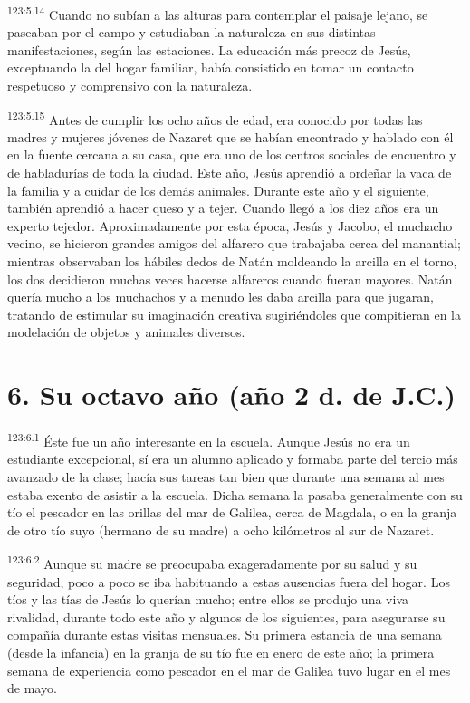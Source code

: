 \par 
\textsuperscript{123:5.14} Cuando no subían a las alturas para contemplar el paisaje lejano, se paseaban por el campo y estudiaban la naturaleza en sus distintas manifestaciones, según las estaciones. La educación más precoz de Jesús, exceptuando la del hogar familiar, había consistido en tomar un contacto respetuoso y comprensivo con la naturaleza.

\par 
\textsuperscript{123:5.15} Antes de cumplir los ocho años de edad, era conocido por todas las madres y mujeres jóvenes de Nazaret que se habían encontrado y hablado con él en la fuente cercana a su casa, que era uno de los centros sociales de encuentro y de habladurías de toda la ciudad. Este año, Jesús aprendió a ordeñar la vaca de la familia y a cuidar de los demás animales. Durante este año y el siguiente, también aprendió a hacer queso y a tejer. Cuando llegó a los diez años era un experto tejedor. Aproximadamente por esta época, Jesús y Jacobo, el muchacho vecino, se hicieron grandes amigos del alfarero que trabajaba cerca del manantial; mientras observaban los hábiles dedos de Natán moldeando la arcilla en el torno, los dos decidieron muchas veces hacerse alfareros cuando fueran mayores. Natán quería mucho a los muchachos y a menudo les daba arcilla para que jugaran, tratando de estimular su imaginación creativa sugiriéndoles que compitieran en la modelación de objetos y animales diversos.

\section*{6. Su octavo año (año 2 d. de J.C.)}
\par 
\textsuperscript{123:6.1} Éste fue un año interesante en la escuela. Aunque Jesús no era un estudiante excepcional, sí era un alumno aplicado y formaba parte del tercio más avanzado de la clase; hacía sus tareas tan bien que durante una semana al mes estaba exento de asistir a la escuela. Dicha semana la pasaba generalmente con su tío el pescador en las orillas del mar de Galilea, cerca de Magdala, o en la granja de otro tío suyo (hermano de su madre) a ocho kilómetros al sur de Nazaret.

\par 
\textsuperscript{123:6.2} Aunque su madre se preocupaba exageradamente por su salud y su seguridad, poco a poco se iba habituando a estas ausencias fuera del hogar. Los tíos y las tías de Jesús lo querían mucho; entre ellos se produjo una viva rivalidad, durante todo este año y algunos de los siguientes, para asegurarse su compañía durante estas visitas mensuales. Su primera estancia de una semana (desde la infancia) en la granja de su tío fue en enero de este año; la primera semana de experiencia como pescador en el mar de Galilea tuvo lugar en el mes de mayo.

